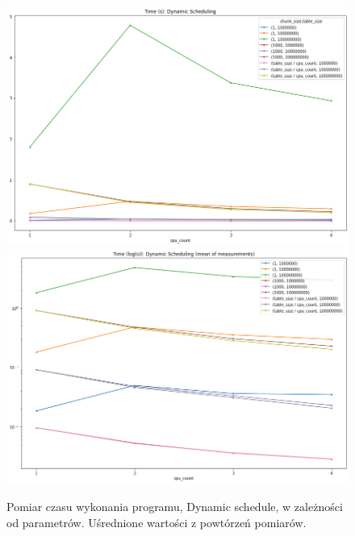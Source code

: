 \documentclass{article}
\begin{document}
        \newpage
        \begin{figure}[h!]
            \centering
            \includegraphics[width=17cm]{report2/images/Type/ex3_dynamic_mean.png}
            \includegraphics[width=17cm]{report2/images/Type/ex3_dynamic_mean_log.png}
            \caption{Pomiar czasu wykonania programu, Dynamic schedule, w zależności od parametrów. Uśrednione wartości z powtórzeń pomiarów. }
        \end{figure}
\end{document}
